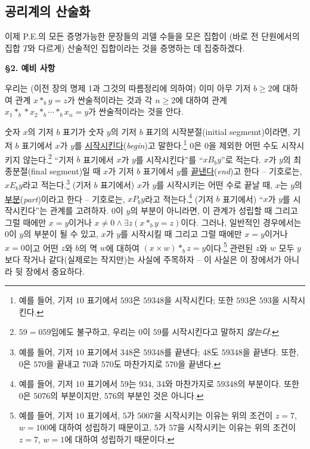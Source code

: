 \documentclass[12pt]{paper}
\begin{document}
\subsection{공리계의 산술화}
\hspace{12pt}

이제 P.E.의 모든 증명가능한 문장들의 괴델 수들을 모은 집합이 (바로 전 단원에서의 집합 $T$와 다르게) 산술적인 집합이라는 것을 증명하는 데 집중하겠다.

\noindent \textbf{\S2. 예비 사항}

우리는 (이전 장의 명제 1과 그것의 따름정리에 의하여)
이미 아무 기저 $ b \ge 2 $에 대하여 관계 $ x *_{b} y = z $가 싼술적이라는 것과
각 $n \ge 2$에 대하여 관계 $ x_1 *_{b} * x_2 *_{b} \cdots *_{b} x_n = y $가 싼술적이라는 것을 안다.

숫자 $x$의 기저 $b$ 표기가 숫자 $y$의 기저 $b$ 표기의 시작분절(initial segmemt)이라면,
기저 $b$ 표기에서 $x$가 $y$를 \underline{시작시킨다}(\textit{begin})고 말한다.\footnote
{
예를 들어, 기저 $10$ 표기에서 $593$은 $59348$을 시작시킨다; 또한 $593$은 $593$을 시작시킨다.
}
$0$은 $0$을 제외한 어떤 수도 시작시키지 않는다.\footnote
{
$59 = 059$임에도 불구하고, 우리는 $0$이 $59$를 시작시킨다고 말하지 \textit{않는다}.
}
``기저 $b$ 표기에서 $x$가 $y$를 시작시킨다''를 ``$x B_{b} y$''로 적는다.
$x$가 $y$의 최종분절(final segment)일 때 $x$가 기저 $b$ 표기에서 $y$를 \underline{끝낸다}(\textit{end})고 한다 -- 기호로는, $x E_{b} y$라고 적는다.\footnote
{
예를 들어, 기저 $10$ 표기에서 $348$은 $59348$를 끝낸다; $48$도 $59348$을 끝낸다.
또한, $0$은 $570$을 끝내고 $70$과 $570$도 마찬가지로 $570$을 끝낸다.
}
(기저 $b$ 표기에서) $x$가 $y$를 시작시키는 어떤 수로 끝날 때, $x$는 $y$의 \underline{부분}(\textit{part})이라고 한다 -- 기호로는, $x P_{b} y$라고 적는다.\footnote
{
예를 들어, 기저 $10$ 표기에서 $59$는 $934$, $34$와 마찬가지로 $59348$의 부분이다.
또한 $0$은 $5076$의 부분이지만, $576$의 부분인 것은 아니다.
}
(기저 $b$ 표기에서) ``$x$가 $y$를 시작시킨다''는 관계를 고려하자.
$0$이 $y$의 부분이 아니라면, 이 관계가 성립할 때 그리고 그럴 때에만 $x = y$이거나 $x \ne 0 \land \exists z \left( x *_{b} y = z \right)$이다.
그러나, 일반적인 경우에서는 $0$이 $y$의 부분이 될 수 있고, $x$가 $y$를 시작시킬 때 그리고 그럴 때에만 $x = y$이거나 $x = 0$이고 어떤 $z$와 $b$의 멱 $w$에 대하여 $\left( x \times w \right) *_{b} z = y$이다.\footnote
{
예를 들어, 기저 $10$ 표기에서, $5$가 $5007$을 시작시키는 이유는 위의 조건이 $z = 7$, $w = 100$에 대하여 성립하기 때문이고,
$5$가 $57$을 시작시키는 이유는 위의 조건이 $z = 7$, $w = 1$에 대하여 성립하기 때문이다.
}
관련된 $z$와 $w$ 모두 $y$보다 작거나 같다(실제로는 작지만)는 사실에 주목하자 -- 이 사실은 이 장에서가 아니라 뒷 장에서 중요하다.
\end{document}
